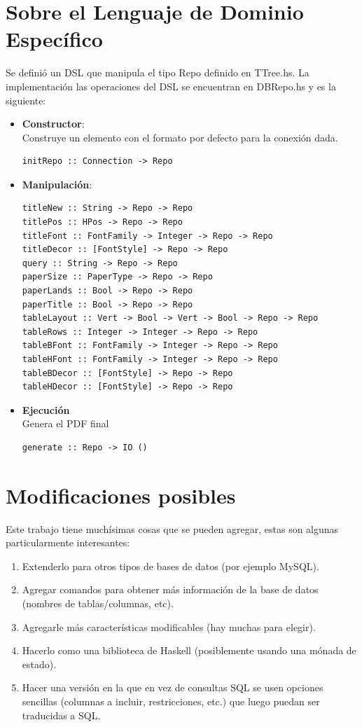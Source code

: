 \documentclass[a4paper,12pt]{article}
\begin{document}
\section{Sobre el Lenguaje de Dominio Específico}
Se definió un DSL que manipula el tipo Repo definido en TTree.hs.
La implementación las operaciones del DSL se encuentran en DBRepo.hs y es la siguiente:
\begin{itemize}
\item \textbf{Constructor}:\\
Construye un elemento con el formato por defecto para la conexión dada.
\begin{verbatim}
initRepo :: Connection -> Repo
\end{verbatim}
\item \textbf{Manipulación}:
\begin{verbatim}
titleNew :: String -> Repo -> Repo
titlePos :: HPos -> Repo -> Repo
titleFont :: FontFamily -> Integer -> Repo -> Repo
titleDecor :: [FontStyle] -> Repo -> Repo
query :: String -> Repo -> Repo
paperSize :: PaperType -> Repo -> Repo
paperLands :: Bool -> Repo -> Repo
paperTitle :: Bool -> Repo -> Repo
tableLayout :: Vert -> Bool -> Vert -> Bool -> Repo -> Repo
tableRows :: Integer -> Integer -> Repo -> Repo
tableBFont :: FontFamily -> Integer -> Repo -> Repo
tableHFont :: FontFamily -> Integer -> Repo -> Repo
tableBDecor :: [FontStyle] -> Repo -> Repo
tableHDecor :: [FontStyle] -> Repo -> Repo
\end{verbatim}
\item \textbf{Ejecución}\\
Genera el PDF final
\begin{verbatim}
generate :: Repo -> IO ()
\end{verbatim}
\end{itemize}

\section{Modificaciones posibles}
Este trabajo tiene muchísimas cosas que se pueden agregar, estas son algunas particularmente interesantes:
\begin{enumerate}
\item Extenderlo para otros tipos de bases de datos (por ejemplo MySQL).
\item Agregar comandos para obtener más información de la base de datos (nombres de tablas/columnas, etc). %
\item Agregarle más características modificables (hay muchas para elegir).
\item Hacerlo como una biblioteca de Haskell (posiblemente usando una mónada de estado).
\item Hacer una versión en la que en vez de consultas SQL se usen opciones sencillas (columnas a incluir, restricciones, etc.) que luego puedan ser traducidas a SQL.
\end{enumerate}
\end{document}
